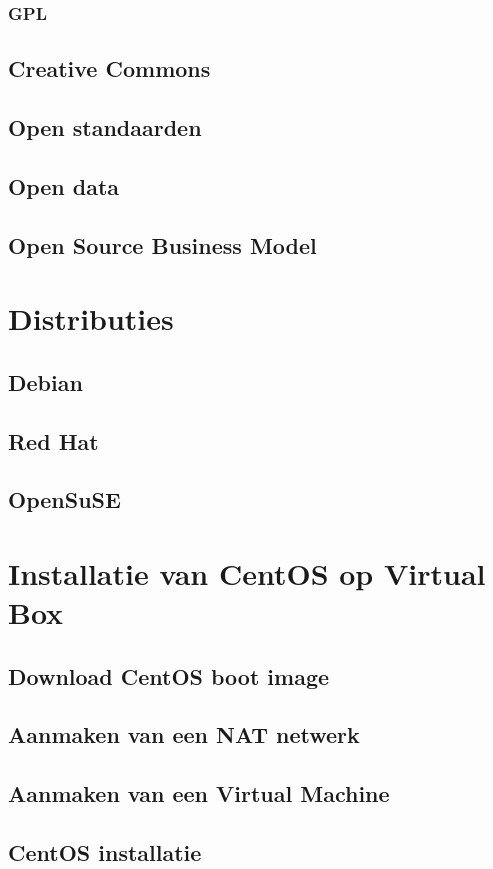 \documentclass[a4paper,12pt,twoside,openright,titlepage]{book}
\begin{document}
\subsection{GPL}

\section{Creative Commons}

\section{Open standaarden}

\section{Open data}

\section{Open Source Business Model}


\chapter{Distributies}

\section{Debian}

\section{Red Hat}

\section{OpenSuSE}


\chapter{Installatie van CentOS op Virtual Box}
\section{Download CentOS boot image}

\section{Aanmaken van een NAT netwerk}

\section{Aanmaken van een Virtual Machine}

\section{CentOS installatie}


\backmatter
\printindex
\end{document}

